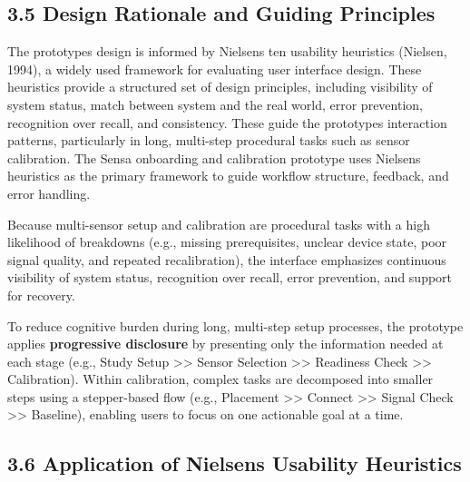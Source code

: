 \documentclass[
]{article}
\begin{document}
\hypertarget{design-rationale-and-guiding-principles}{%
\subsection{\texorpdfstring{3.5 Design Rationale and Guiding Principles }{3.5 Design Rationale and Guiding Principles }}\label{design-rationale-and-guiding-principles}}

The prototype\textquotesingle s design is informed by Nielsen\textquotesingle s ten usability heuristics (Nielsen, 1994), a widely used framework for evaluating user interface design. These heuristics provide a structured set of design principles, including visibility of system status, match between system and the real world, error prevention, recognition over recall, and consistency. These guide the prototype\textquotesingle s interaction patterns, particularly in long, multi-step procedural tasks such as sensor calibration. The Sensa onboarding and calibration prototype uses Nielsen\textquotesingle s heuristics as the primary framework to guide workflow structure, feedback, and error handling.

Because multi-sensor setup and calibration are procedural tasks with a high likelihood of breakdowns (e.g., missing prerequisites, unclear device state, poor signal quality, and repeated recalibration), the interface emphasizes continuous visibility of system status, recognition over recall, error prevention, and support for recovery.

To reduce cognitive burden during long, multi-step setup processes, the prototype applies \textbf{progressive disclosure} by presenting only the information needed at each stage (e.g., Study Setup \textgreater\textgreater{} Sensor Selection \textgreater\textgreater{} Readiness Check \textgreater\textgreater{} Calibration). Within calibration, complex tasks are decomposed into smaller steps using a stepper-based flow (e.g., Placement \textgreater\textgreater{} Connect \textgreater\textgreater{} Signal Check \textgreater\textgreater{} Baseline), enabling users to focus on one actionable goal at a time.

\hypertarget{application-of-nielsens-usability-heuristics}{%
\subsection{\texorpdfstring{3.6 Application of Nielsen\textquotesingle s Usability Heuristics }{3.6 Application of Nielsen\textquotesingle s Usability Heuristics }}\label{application-of-nielsens-usability-heuristics}}
\end{document}
